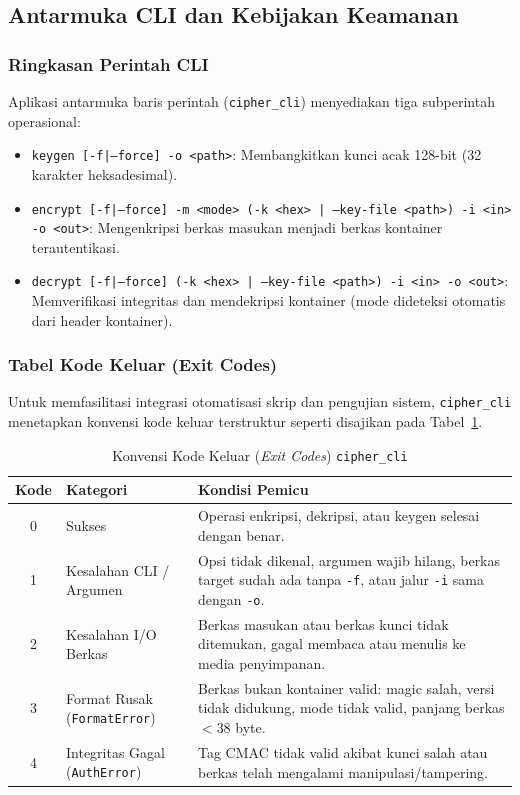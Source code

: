 \subsection{Antarmuka CLI dan Kebijakan Keamanan}

\subsubsection{Ringkasan Perintah CLI}
Aplikasi antarmuka baris perintah (\texttt{cipher\_cli}) menyediakan tiga subperintah operasional:
\begin{itemize}
    \item \texttt{keygen [-f|--force] -o <path>}: Membangkitkan kunci acak 128-bit (32 karakter heksadesimal).
    \item \texttt{encrypt [-f|--force] -m <mode> (-k <hex> | --key-file <path>) -i <in> -o <out>}: Mengenkripsi berkas masukan menjadi berkas kontainer terautentikasi.
    \item \texttt{decrypt [-f|--force] (-k <hex> | --key-file <path>) -i <in> -o <out>}: Memverifikasi integritas dan mendekripsi kontainer (mode dideteksi otomatis dari header kontainer).
\end{itemize}

\subsubsection{Tabel Kode Keluar (Exit Codes)}
Untuk memfasilitasi integrasi otomatisasi skrip dan pengujian sistem, \texttt{cipher\_cli} menetapkan konvensi kode keluar terstruktur seperti disajikan pada Tabel~\ref{tab:exit_codes}.

\begin{table}[ht]
\centering
\caption{Konvensi Kode Keluar (\textit{Exit Codes}) \texttt{cipher\_cli}}
\label{tab:exit_codes}
\begin{tabular}{|c|l|p{8.5cm}|}
\hline
\textbf{Kode} & \textbf{Kategori} & \textbf{Kondisi Pemicu} \\
\hline
0 & Sukses & Operasi enkripsi, dekripsi, atau keygen selesai dengan benar. \\
1 & Kesalahan CLI / Argumen & Opsi tidak dikenal, argumen wajib hilang, berkas target sudah ada tanpa \texttt{-f}, atau jalur \texttt{-i} sama dengan \texttt{-o}. \\
2 & Kesalahan I/O Berkas & Berkas masukan atau berkas kunci tidak ditemukan, gagal membaca atau menulis ke media penyimpanan. \\
3 & Format Rusak (\texttt{FormatError}) & Berkas bukan kontainer valid: magic salah, versi tidak didukung, mode tidak valid, panjang berkas $< 38$ byte. \\
4 & Integritas Gagal (\texttt{AuthError}) & Tag CMAC tidak valid akibat kunci salah atau berkas telah mengalami manipulasi/tampering. \\
\hline
\end{tabular}
\end{table}

